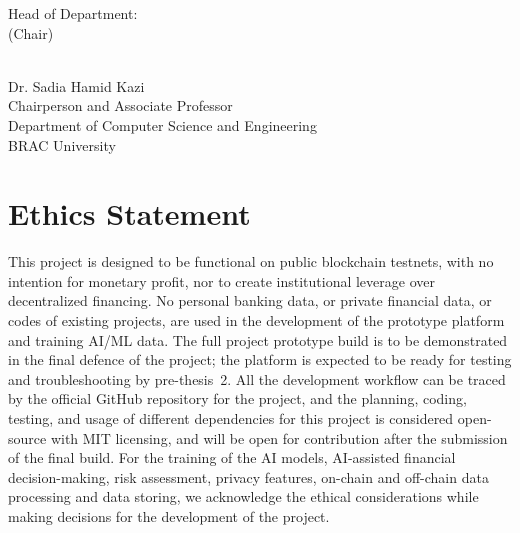 \documentclass[12pt, a4paper]{report}
\begin{document}
\newpage
\thispagestyle{empty}

\null\vfill

\begin{flushleft}
Head of Department:\\
(Chair)
\end{flushleft}

\begin{flushright}
\vspace{-0.5cm}
\hrulefill\\
Dr. Sadia Hamid Kazi\\
Chairperson and Associate Professor\\
Department of Computer Science and Engineering\\
BRAC University
\end{flushright}

\vfill\null

\newpage
\thispagestyle{empty}

\chapter*{Ethics Statement}
{}

This project is designed to be functional on public blockchain testnets, with no intention for monetary profit, nor to create institutional leverage over decentralized financing. No personal banking data, or private financial data, or codes of existing projects, are used in the development of the prototype platform and training AI/ML data. The full project prototype build is to be demonstrated in the final defence of the project; the platform is expected to be ready for testing and troubleshooting by pre-thesis~2. All the development workflow can be traced by the official GitHub repository for the project, and the planning, coding, testing, and usage of different dependencies for this project is considered open-source with MIT licensing, and will be open for contribution after the submission of the final build. For the training of the AI models, AI-assisted financial decision-making, risk assessment, privacy features, on-chain and off-chain data processing and data storing, we acknowledge the ethical considerations while making decisions for the development of the project.

\newpage
\thispagestyle{empty}
\end{document}
